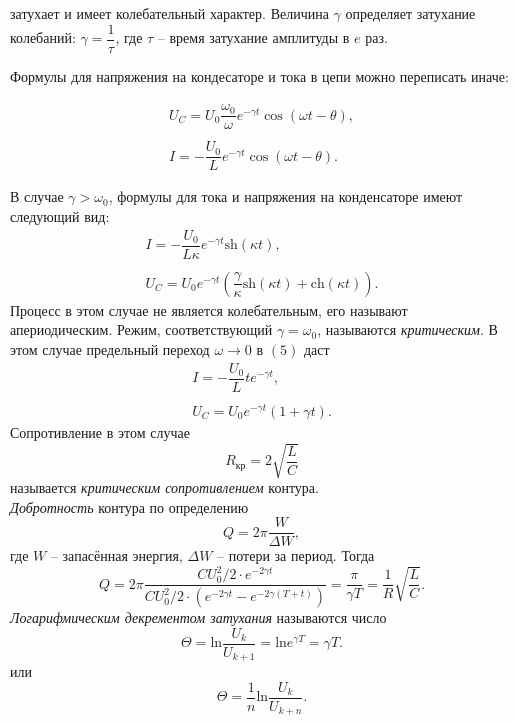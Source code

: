 \documentclass[a4paper,12pt]{article}
\begin{document}
 затухает и имеет колебательный характер. Величина $\gamma$ определяет затухание колебаний: $\gamma = \dfrac{1}{\tau}$, где $\tau$ -- время затухание амплитуды в $e$ раз.
 
Формулы для напряжения на кондесаторе и тока в цепи можно переписать иначе:

\begin{equation}
\begin{array}{c}
U_C = U_0 \dfrac{\omega_0}{\omega}e^{-\gamma t} \cos(\omega t - \theta),\\
\\
I = -\dfrac{U_0}{L}e^{-\gamma t} \cos(\omega t - \theta).
\end{array}
\end{equation}

В случае $\gamma > \omega_0$, формулы для тока и напряжения на конденсаторе имеют следующий вид:
$$
\begin{array}{c}
I = -\dfrac{U_0}{L\kappa}e^{-\gamma t}\text{sh}(\kappa t),\\
\\
U_C = U_0 e^{-\gamma t}\left( \dfrac{\gamma}{\kappa}\text{sh}(\kappa t) + \text{ch}(\kappa t) \right).
\end{array}
$$
Процесс в этом случае не является колебательным, его называют апериодическим. Режим, соответствующий $\gamma = \omega_0$, называются \textit{критическим}. В этом случае предельный переход $\omega \rightarrow 0$ в $(5)$ даст 
$$
\begin{array}{c}
I = -\dfrac{U_0}{L}te^{-\gamma t},\\
\\
U_C=U_0 e^{-\gamma t}(1+\gamma t).
\end{array}
$$
Сопротивление в этом случае 
\begin{equation}
R_{\text{кр}}= 2 \sqrt{\dfrac{L}{C}}
\end{equation}
называется \textit{критическим сопротивлением} контура.\\
\textit{Добротность} контура по определению 
$$
Q = 2\pi \dfrac{W}{\Delta W},
$$ 
где $W$ -- запасённая энергия, $\Delta W$ -- потери за период. Тогда
\begin{equation}
Q = 2\pi\dfrac{CU_0^2/2 \cdot e^{-2\gamma t}}{CU_0^2/2 \cdot (e^{-2\gamma t} - e^{-2\gamma (T+t)})}=\dfrac{\pi}{\gamma T}=\dfrac{1}{R}\sqrt{\dfrac{L}{C}}.
\end{equation}
\textit{Логарифмическим декрементом затухания} называются число
\begin{equation}
\Theta = \text{ln}\dfrac{U_k}{U_{k+1}}=\text{ln} e^{\gamma T}=\gamma T.
\end{equation}
или 
\begin{equation}
\Theta = \dfrac{1}{n} \text{ln}\dfrac{U_k}{U_{k+n}}.
\end{equation}
\end{document}
